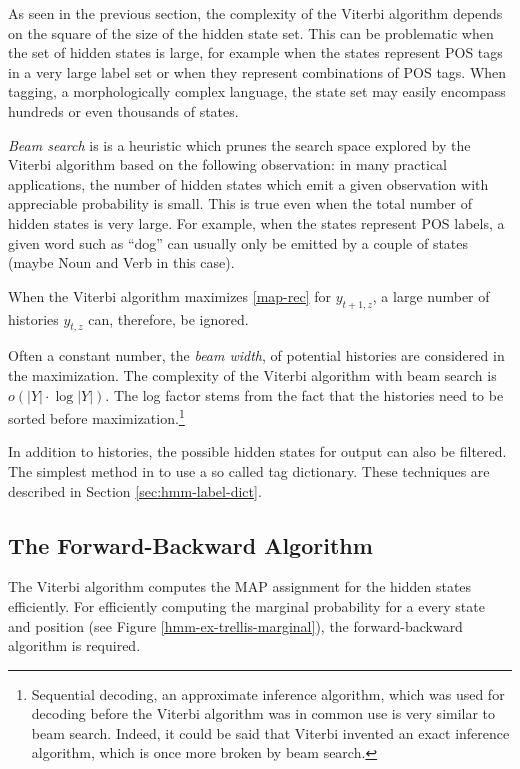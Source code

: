 As seen in the previous section, the complexity of the Viterbi
algorithm depends on the square of the size of the hidden state
set. This can be problematic when the set of hidden states is large,
for example when the states represent POS tags in a very large label
set or when they represent combinations of POS tags. When tagging, a
morphologically complex language, the state set may easily encompass
hundreds or even thousands of states.

{\it Beam search} is is a heuristic which prunes the search space
explored by the Viterbi algorithm based on the following observation:
in many practical applications, the number of hidden states which emit
a given observation with appreciable probability is small. This is
true even when the total number of hidden states is very large. For
example, when the states represent POS labels, a given word such as
``dog'' can usually only be emitted by a couple of states (maybe Noun
and Verb in this case).

When the Viterbi algorithm maximizes \eqref{map-rec} for $y_{t+1,z}$,
a large number of histories $y_{t,z}$ can, therefore, be ignored.

Often a constant number, the {\it beam width}, of potential histories
are considered in the maximization. The complexity of the Viterbi
algorithm with beam search is $o(|Y|\cdot \log|Y|)$. The log factor
stems from the fact that the histories need to be sorted before
maximization.\footnote{Sequential decoding, an approximate inference
  algorithm, which was used for decoding before the Viterbi algorithm
  was in common use \citep{Forney2005} is very similar to beam
  search. Indeed, it could be said that Viterbi invented an exact
  inference algorithm, which is once more broken by beam search.}

In addition to histories, the possible hidden states for output can
also be filtered. The simplest method in to use a so called tag
dictionary. These techniques are described in Section
\ref{sec:hmm-label-dict}.

\subsection{The Forward-Backward Algorithm}
\label{hmm-fw-bw}
The Viterbi algorithm computes the MAP assignment for the hidden
states efficiently. For efficiently computing the marginal probability
for a every state and position (see Figure
\ref{hmm-ex-trellis-marginal}), the forward-backward algorithm is
required.


